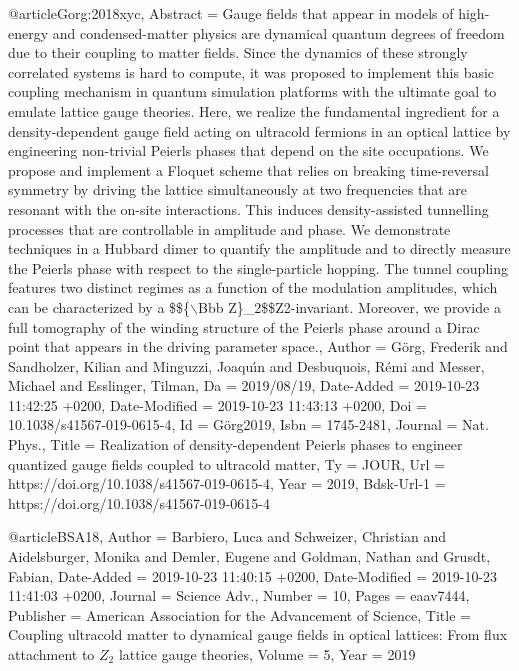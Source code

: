\documentclass[epj,final]{svjour}
\begin{document}
@article{Gorg:2018xyc,
	Abstract = {Gauge fields that appear in models of high-energy and condensed-matter physics are dynamical quantum degrees of freedom due to their coupling to matter fields. Since the dynamics of these strongly correlated systems is hard to compute, it was proposed to implement this basic coupling mechanism in quantum simulation platforms with the ultimate goal to emulate lattice gauge theories. Here, we realize the fundamental ingredient for a density-dependent gauge field acting on ultracold fermions in an optical lattice by engineering non-trivial Peierls phases that depend on the site occupations. We propose and implement a Floquet scheme that relies on breaking time-reversal symmetry by driving the lattice simultaneously at two frequencies that are resonant with the on-site interactions. This induces density-assisted tunnelling processes that are controllable in amplitude and phase. We demonstrate techniques in a Hubbard dimer to quantify the amplitude and to directly measure the Peierls phase with respect to the single-particle hopping. The tunnel coupling features two distinct regimes as a function of the modulation amplitudes, which can be characterized by a {\$}{\$}{\{}{$\backslash$}Bbb Z{\}}{\_}2{\$}{\$}Z2-invariant. Moreover, we provide a full tomography of the winding structure of the Peierls phase around a Dirac point that appears in the driving parameter space.},
	Author = {G{\"o}rg, Frederik and Sandholzer, Kilian and Minguzzi, Joaqu{\'\i}n and Desbuquois, R{\'e}mi and Messer, Michael and Esslinger, Tilman},
	Da = {2019/08/19},
	Date-Added = {2019-10-23 11:42:25 +0200},
	Date-Modified = {2019-10-23 11:43:13 +0200},
	Doi = {10.1038/s41567-019-0615-4},
	Id = {G{\"o}rg2019},
	Isbn = {1745-2481},
	Journal = {Nat. Phys.},
	Title = {Realization of density-dependent Peierls phases to engineer quantized gauge fields coupled to ultracold matter},
	Ty = {JOUR},
	Url = {https://doi.org/10.1038/s41567-019-0615-4},
	Year = {2019},
	Bdsk-Url-1 = {https://doi.org/10.1038/s41567-019-0615-4}}

@article{BSA18,
	Author = {Barbiero, Luca and Schweizer, Christian and Aidelsburger, Monika and Demler, Eugene and Goldman, Nathan and Grusdt, Fabian},
	Date-Added = {2019-10-23 11:40:15 +0200},
	Date-Modified = {2019-10-23 11:41:03 +0200},
	Journal = {Science Adv.},
	Number = {10},
	Pages = {eaav7444},
	Publisher = {American Association for the Advancement of Science},
	Title = {Coupling ultracold matter to dynamical gauge fields in optical lattices: From flux attachment to {$Z_2$} lattice gauge theories},
	Volume = {5},
	Year = {2019}}
\end{document}
